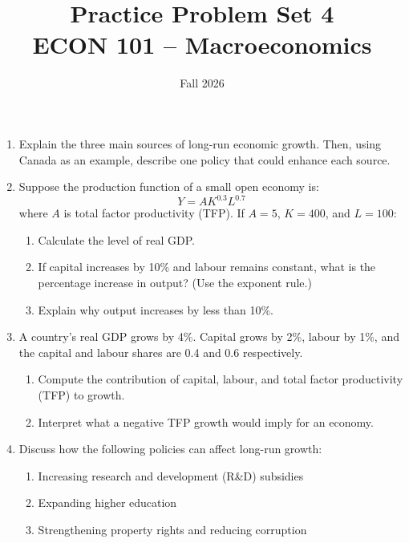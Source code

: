 \documentclass[12pt]{article}
\title{Practice Problem Set 4\\ \vspace{10pt} \large ECON 101 -- Macroeconomics}
\author{}
\date{ \vspace{-30pt} Fall 2026}
\begin{document}
\maketitle





\begin{enumerate}[label=\textbf{\arabic*.}, leftmargin=1.5em]

\item Explain the three main sources of long-run economic growth. Then, using Canada as an example, describe one policy that could enhance each source.

\vspace{1em}

\item Suppose the production function of a small open economy is:
\[
Y = A K^{0.3} L^{0.7}
\]
where $A$ is total factor productivity (TFP). If $A = 5$, $K = 400$, and $L = 100$:

\begin{enumerate}[label=(\alph*)]
\item Calculate the level of real GDP.
\item If capital increases by 10\% and labour remains constant, what is the percentage increase in output? (Use the exponent rule.)
\item Explain why output increases by less than 10\%.
\end{enumerate}

\vspace{1em}

\item A country’s real GDP grows by 4\%. Capital grows by 2\%, labour by 1\%, and the capital and labour shares are 0.4 and 0.6 respectively.

\begin{enumerate}[label=(\alph*)]
\item Compute the contribution of capital, labour, and total factor productivity (TFP) to growth.
\item Interpret what a negative TFP growth would imply for an economy.
\end{enumerate}

\vspace{1em}

\item Discuss how the following policies can affect long-run growth:
\begin{enumerate}[label=(\alph*)]
\item Increasing research and development (R\&D) subsidies
\item Expanding higher education
\item Strengthening property rights and reducing corruption
\end{enumerate}

\end{enumerate}
\end{document}
